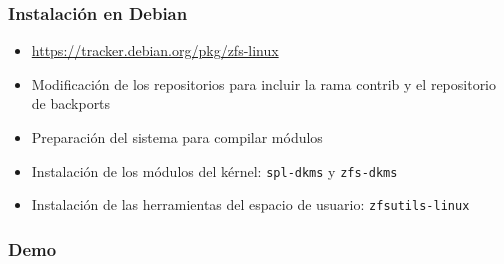 \documentclass[aspectratio=169]{beamer}
\begin{document}
\begin{frame}
  \frametitle{Instalación en Debian}
  \begin{itemize}
  \item \url{https://tracker.debian.org/pkg/zfs-linux}
  \item Modificación de los repositorios para incluir la rama contrib
    y el repositorio de backports
  \item Preparación del sistema para compilar módulos
  \item Instalación de los módulos del kérnel: \texttt{spl-dkms} y \texttt{zfs-dkms}
  \item Instalación de las herramientas del espacio de usuario: \texttt{zfsutils-linux}
  \end{itemize}
\end{frame}

\begin{frame}
  \frametitle{Demo}
\end{frame}
\end{document}
